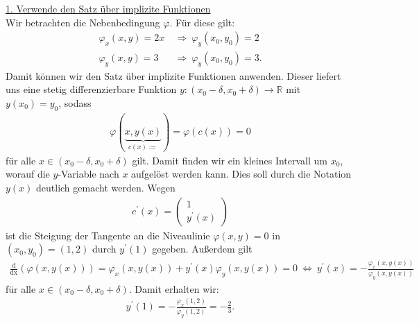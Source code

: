 \underline{1. Verwende den Satz über implizite Funktionen}\\
Wir betrachten die Nebenbedingung $ \varphi $. Für diese gilt:
\begin{align*}
\varphi_x(x,y) = 2x \ &\Rightarrow \ \varphi_y(x_0,y_0) = 2\\
\varphi_y(x,y) = 3 \ &\Rightarrow \ \varphi_y(x_0,y_0) = 3.
\end{align*}
Damit können wir den Satz über implizite Funktionen anwenden. Dieser liefert uns eine stetig differenzierbare Funktion $ y : (x_0- \delta, x_0 + \delta) \to \mathbb{R} $ mit $ y(x_0) = y_0 $, sodass
\begin{align*}
\varphi(\underbrace{x, y(x)}_{c(x):=}) = \varphi(c(x)) =  0 
\end{align*}
für alle $ x \in (x_0- \delta, x_0 + \delta)   $ gilt.
Damit finden wir ein kleines Intervall um $ x_0 $, worauf die $ y $-Variable nach $ x $ aufgelöst werden kann.
Dies soll durch die Notation $ y(x) $ deutlich gemacht werden. 
Wegen 
\begin{align*}
c^\prime(x) = 
\begin{pmatrix}
1 \\ y^\prime(x)
\end{pmatrix}
\end{align*}
ist die Steigung der Tangente an die Niveaulinie $ \varphi(x,y) = 0 $ in $ (x_0,y_0) = (1,2) $ durch $ y^\prime(1)  $ gegeben.
Außerdem gilt
\begin{align*}
\frac{\mathrm{d}}{\mathrm{dx}}
(\varphi(x, y(x)) )
=
\varphi_x(x,y(x)) + y^{\prime}(x) \varphi_y(x,y(x)) = 0
\ \Leftrightarrow \
y^\prime(x)
=
-\frac{\varphi_x(x,y(x))}{\varphi_y(x,y(x))}
\end{align*}
für alle $ x \in (x_0 - \delta,x_0 + \delta) $. Damit erhalten wir:
\begin{align*}
y^\prime(1) = - \frac{\varphi_x(1,2)}{\varphi_y(1,2)} = - \frac{2}{3}.
\end{align*}

